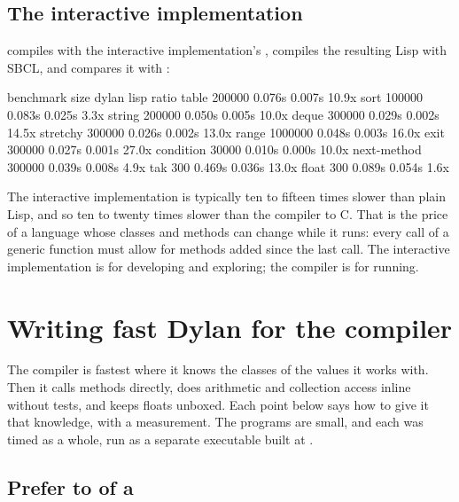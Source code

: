 \subsection{The interactive implementation}

 compiles  with the interactive
implementation's , compiles the resulting Lisp
with SBCL, and compares it with :

\begin{shell}
benchmark         size      dylan       lisp    ratio
table           200000     0.076s     0.007s    10.9x
sort            100000     0.083s     0.025s     3.3x
string          200000     0.050s     0.005s    10.0x
deque           300000     0.029s     0.002s    14.5x
stretchy        300000     0.026s     0.002s    13.0x
range          1000000     0.048s     0.003s    16.0x
exit            300000     0.027s     0.001s    27.0x
condition        30000     0.010s     0.000s    10.0x
next-method     300000     0.039s     0.008s     4.9x
tak                300     0.469s     0.036s    13.0x
float              300     0.089s     0.054s     1.6x
\end{shell}

The interactive implementation is typically ten to fifteen times slower
than plain Lisp, and so ten to twenty times slower than the compiler to
C. That is the price of a language whose classes and methods can change
while it runs: every call of a generic function must allow for methods
added since the last call. The interactive implementation is for
developing and exploring; the compiler is for running.

\section{Writing fast Dylan for the compiler}\label{sec:perf-c}

The compiler is fastest where it knows the classes of the values it
works with. Then it calls methods directly, does arithmetic and
collection access inline without tests, and keeps floats unboxed. Each
point below says how to give it that knowledge, with a measurement. The
programs are small, and each was timed as a whole, run as a separate
executable built at .

\subsection{Prefer  to  of a }

